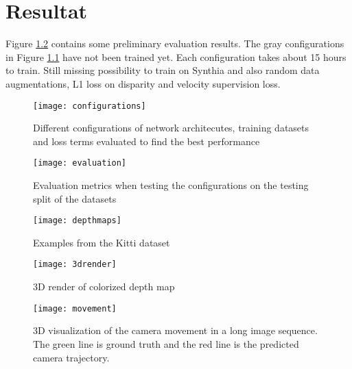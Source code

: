\chapter{Resultat}\label{cha:Research}

Figure \ref{fig:evaluation} contains some preliminary evaluation results. The gray configurations in Figure \ref{fig:configurations} have not been trained yet. Each configuration takes about 15 hours to train. Still missing possibility to train on Synthia and also random data augmentations, L1 loss on disparity and velocity supervision loss.

\begin{figure}[H]
	\centering
	\texttt{[image: configurations]}
	\caption{Different configurations of network architecutes, training datasets and loss terms evaluated to find the best performance}
	\label{fig:configurations}
\end{figure}

\begin{figure}[H]
	\centering
	\texttt{[image: evaluation]}
	\caption{Evaluation metrics when testing the configurations on the testing split of the datasets}
	\label{fig:evaluation}
\end{figure}

\clearpage

\begin{figure}[H]
	\centering
	\texttt{[image: depthmaps]}
	\caption{Examples from the Kitti dataset}
	\label{fig:depthmapskitty}
\end{figure}


\begin{figure}[H]
	\centering
	\texttt{[image: 3drender]}
	\caption{3D render of colorized depth map}
	\label{fig:3drender}
\end{figure}

\begin{figure}[H]
	\centering
	\texttt{[image: movement]}
	\caption{3D visualization of the camera movement in a long image sequence. The green line is ground truth and the red line is the predicted camera trajectory.}
	\label{fig:movement}
\end{figure}